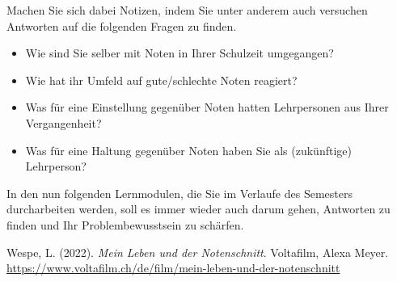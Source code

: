 \documentclass[
  10pt,
  a4paper,
  DIV=11]{scrartcl}
\providecommand{\tightlist}{%
  \setlength{\itemsep}{0pt}\setlength{\parskip}{0pt}}\usepackage{longtable,booktabs,array}
\newlength{\cslhangindent}
\newenvironment{CSLReferences}[2] %
 {\begin{list}{}{%
  \setlength{\itemindent}{0pt}
  \setlength{\leftmargin}{0pt}
  \setlength{\parsep}{0pt}
  \ifodd #1
   \setlength{\leftmargin}{\cslhangindent}
   \setlength{\itemindent}{-1\cslhangindent}
  \fi
  \setlength{\itemsep}{#2\baselineskip}}}
 {\end{list}}
\begin{document}
\begin{tcolorbox}[enhanced jigsaw, title=\textcolor{quarto-callout-caution-color}{\faFire}\hspace{0.5em}{Aufträge auf LearningView}, colframe=quarto-callout-caution-color-frame, colbacktitle=quarto-callout-caution-color!10!white, left=2mm, leftrule=.75mm, arc=.35mm, toptitle=1mm, bottomrule=.15mm, breakable, opacityback=0, bottomtitle=1mm, coltitle=black, titlerule=0mm, opacitybacktitle=0.6, rightrule=.15mm, colback=white, toprule=.15mm]

Machen Sie sich dabei Notizen, indem Sie unter anderem auch versuchen
Antworten auf die folgenden Fragen zu finden.

\begin{itemize}
\tightlist
\item
  Wie sind Sie selber mit Noten in Ihrer Schulzeit umgegangen?
\item
  Wie hat ihr Umfeld auf gute/schlechte Noten reagiert?
\item
  Was für eine Einstellung gegenüber Noten hatten Lehrpersonen aus Ihrer
  Vergangenheit?
\item
  Was für eine Haltung gegenüber Noten haben Sie als (zukünftige)
  Lehrperson?
\end{itemize}

\end{tcolorbox}

In den nun folgenden Lernmodulen, die Sie im Verlaufe des Semesters
durcharbeiten werden, soll es immer wieder auch darum gehen, Antworten
zu finden und Ihr Problembewusstsein zu schärfen.

\label{refs}
\begin{CSLReferences}{1}{0}
Wespe, L. (2022). \emph{Mein Leben und der Notenschnitt}. Voltafilm,
Alexa Meyer.
\url{https://www.voltafilm.ch/de/film/mein-leben-und-der-notenschnitt}

\end{CSLReferences}
\end{document}
